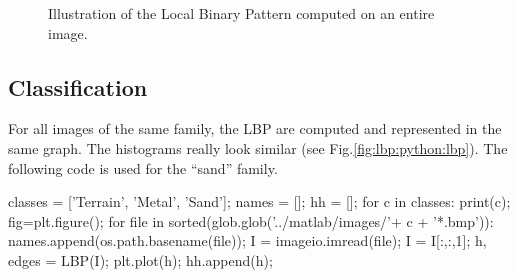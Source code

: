 \begin{figure}[H]
 \centering\caption{Illustration of the Local Binary Pattern computed on an entire image.}%
 \hfill
 \label{fig:lbp:python:lbpmetal1}\vspace*{-5pt}%
\end{figure}

\subsection{Classification}
For all images of the same family, the LBP are computed and represented in the same graph. The histograms really look similar (see Fig.\ref{fig:lbp:python:lbp}). The following code is used for the ``sand'' family.

\begin{python}
classes = ['Terrain', 'Metal', 'Sand'];
names = [];
hh = [];
for c in classes:
    print(c);
    fig=plt.figure();
    for file in sorted(glob.glob('../matlab/images/'+ c + '*.bmp')):
        names.append(os.path.basename(file));
        I = imageio.imread(file);
        I = I[:,:,1];
        h, edges = LBP(I);
        plt.plot(h);
        hh.append(h);
\end{python}

 \vspace*{-5pt}%

